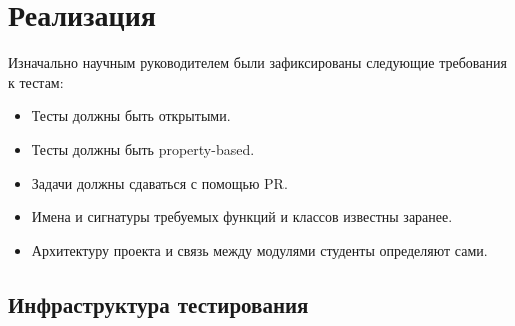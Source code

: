 
\section{Реализация}

Изначально научным руководителем были зафиксированы следующие требования к тестам:
\begin{itemize}
    \item Тесты должны быть открытыми.
    \item Тесты должны быть property-based.
    \item Задачи должны сдаваться с помощью PR.
    \item Имена и сигнатуры требуемых функций и классов известны заранее.
    \item Архитектуру проекта и связь между модулями студенты определяют сами.
\end{itemize}







\subsection{Инфраструктура тестирования}
\label{subsec:infra}

